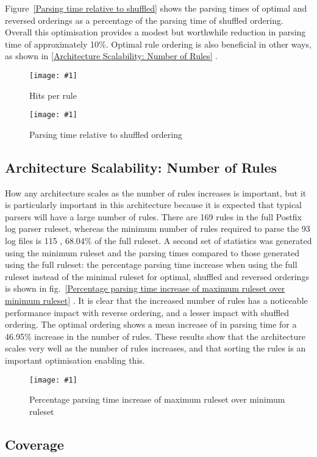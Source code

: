 \documentclass{svmult}
\newcommand{\showgraph}[3]{%
    \begin{figure}[btp]%
        \texttt{[image: \#1]}%
        \caption{#2}\label{#3}%
    \end{figure}%
}
\newcommand{\sectionref}[1]{%
    \textsection{}\vref*{#1}%
}
\newcommand{\refwithlabel}[2]{%
    #1~\vref{#2}%
}
\newcommand{\graphref}[1]{%
    \refwithlabel{fig.}{#1}%
}
\newcommand{\Graphref}[1]{%
    \refwithlabel{Figure}{#1}%
}
\newcommand{\numberOFlogFILES}[0]{%
    93%
}
\newcommand{\numberOFrules}[0]{%
    169%
}
\newcommand{\numberOFrulesMINIMUM}[0]{%
    115%
}
\newcommand{\numberOFrulesMINIMUMpercentage}[0]{%
    68.04\%%
}
\newcommand{\numberOFrulesMAXIMUMpercentage}[0]{%
    46.95\%%
}
\begin{document}
\Graphref{Parsing time relative to shuffled} shows the parsing times of
optimal and reversed orderings as a percentage of the parsing time of
shuffled ordering.  Overall this optimisation provides a modest but
worthwhile reduction in parsing time of approximately 10\%.  Optimal rule
ordering is also beneficial in other ways, as shown in
\sectionref{Architecture Scalability: Number of Rules}.
\showgraph{build/graph-hits}{Hits per rule}{rule hits graph}
\showgraph{build/graph-optimal-and-reverse-vs-shuffle}{Parsing time
relative to shuffled ordering}{Parsing time relative to shuffled}

\subsection{Architecture Scalability: Number of Rules}

\label{Architecture Scalability: Number of Rules}

How any architecture scales as the number of rules increases is important,
but it is particularly important in this architecture because it is
expected that typical parsers will have a large number of rules.  There are
\numberOFrules{} rules in the full Postfix log parser ruleset, whereas the
minimum number of rules required to parse the \numberOFlogFILES{} log files
is \numberOFrulesMINIMUM{}, \numberOFrulesMINIMUMpercentage{} of the full
ruleset.  A second set of statistics was generated using the minimum
ruleset and the parsing times compared to those generated using the full
ruleset: the percentage parsing time increase when using the full ruleset
instead of the minimal ruleset for optimal, shuffled and reversed orderings
is shown in \graphref{Percentage parsing time increase of maximum ruleset
over minimum ruleset}.  It is clear that the increased number of rules has
a noticeable performance impact with reverse ordering, and a lesser impact
with shuffled ordering.  The optimal ordering shows a mean increase of
 in parsing time for a
\numberOFrulesMAXIMUMpercentage{} increase in the number of rules.  These
results show that the architecture scales very well as the number of rules
increases, and that sorting the rules is an important optimisation enabling
this.  \showgraph{build/graph-full-ruleset-vs-minimum-ruleset}{Percentage
parsing time increase of maximum ruleset over minimum ruleset}{Percentage
parsing time increase of maximum ruleset over minimum ruleset}

\subsection{Coverage}
\end{document}
